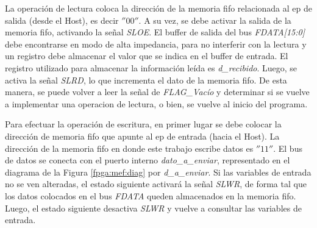 La operación de lectura coloca la dirección de la memoria \acrshort{fifo} relacionada al \acrshort{ep} de salida (desde el Host), es decir $''00''$. A su vez, se debe activar la salida de la memoria \acrshort{fifo}, activando la señal {\it SLOE}. El buffer de salida del bus {\it FDATA[15:0]} debe encontrarse en modo de alta impedancia, para no interferir con la lectura y un registro debe almacenar el valor que se indica en el buffer de entrada. El registro utilizado para almacenar la información leída es {\it d\_recibido}. Luego, se activa la señal {\it SLRD}, lo que incrementa el dato de la memoria \acrshort{fifo}. De esta manera, se puede volver a leer la señal de {\it FLAG\_Vacío} y determinar si se vuelve a implementar una operacion de lectura, o bien, se vuelve al inicio del programa.
 
Para efectuar la operación de escritura, en primer lugar se debe colocar la dirección de memoria \acrshort{fifo} que apunte al \acrshort{ep} de entrada (hacia el Host). La dirección de la memoria \acrshort{fifo} en donde este trabajo escribe datos es $''11''$.  El bus de datos se conecta con el puerto interno {\it dato\_a\_enviar}, representado en el diagrama de la Figura \ref{fpga:mef:diag} por {\it d\_a\_enviar}. Si las variables de entrada no se ven alteradas, el estado siguiente activará la señal {\it SLWR}, de forma tal que los datos colocados en el bus {\it FDATA} queden almacenados en la memoria \acrshort{fifo}. Luego, el estado siguiente desactiva {\it SLWR} y vuelve a consultar las variables de entrada.

%

